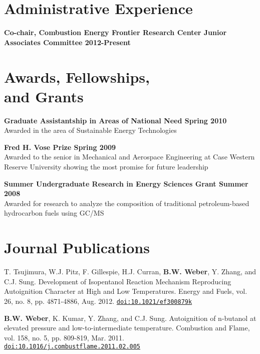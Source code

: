 \documentclass[margin,line]{res}
\newcommand*{\doi}[1]{\href{http://dx.doi.org/#1}{\nolinkurl{doi:#1}}}
\newenvironment{list3}{
  \begin{list}{\ding{113}}{%
      \setlength{\itemsep}{0.1in}
      \setlength{\parsep}{0in} \setlength{\parskip}{0in}
      \setlength{\topsep}{0in} \setlength{\partopsep}{0in} 
      \setlength{\leftmargin}{0in}}}{\end{list}}
\begin{document}
\begin{resume}
\section{\sc Administrative Experience}
{\bf Co-chair, Combustion Energy Frontier Research Center Junior Associates Committee \hfill 2012-Present}

\section{\sc Awards, Fellowships,\\ and Grants}
{\bf Graduate Assistantship in Areas of National Need \hfill Spring 2010}\\
Awarded in the area of Sustainable Energy Technologies

{\bf Fred H. Vose Prize \hfill Spring 2009}\\
Awarded to the senior in Mechanical and Aerospace Engineering at Case Western Reserve University showing the most promise for future leadership

{\bf Summer Undergraduate Research in Energy Sciences Grant \hfill Summer 2008}\\
Awarded for research to analyze the composition of traditional petroleum-based hydrocarbon fuels using GC/MS

\section{\sc Journal Publications}
\begin{list3}
\item[] T. Tsujimura, W.J. Pitz, F. Gillespie, H.J. Curran, {\bf B.W. Weber}, Y. Zhang, and C.J. Sung. Development of Isopentanol Reaction Mechanism Reproducing Autoignition Character at High and Low Temperatures. Energy and Fuels, vol. 26, no. 8, pp. 4871-4886, Aug. 2012. \doi{10.1021/ef300879k}
\item[] {\bf B.W. Weber}, K. Kumar, Y. Zhang, and C.J. Sung. Autoignition of n-butanol at elevated pressure and low-to-intermediate temperature. Combustion and Flame, vol. 158, no. 5, pp. 809-819, Mar. 2011. \doi{10.1016/j.combustflame.2011.02.005}
\end{list3}


\end{resume}
\end{document}
